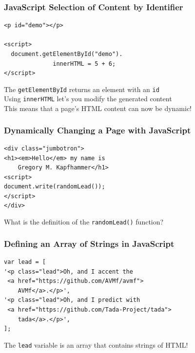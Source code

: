 \documentclass[14pt,aspectratio=169]{beamer}
\begin{document}
%
\begin{frame}[fragile]
  \frametitle{JavaScript Selection of Content by Identifier}
  \normalsize
  \begin{minipage}{6in}
    \vspace*{.1in}
    \begin{verbatim}
<p id="demo"></p>

<script>
  document.getElementById("demo").
              innerHTML = 5 + 6;
</script>
    \end{verbatim}
  \end{minipage}
  \vspace*{.1in}
  \begin{center}
    The {\tt getElementById} returns an element with an {\tt id} \\
    Using {\tt innerHTML} let's you modify the generated content \\
    This means that a page's HTML content can now be dynamic! \\
  \end{center}
\end{frame}

%
\begin{frame}[fragile]
  \frametitle{Dynamically Changing a Page with JavaScript}
  \normalsize
  \begin{minipage}{6in}
    \vspace*{.2in}
    \begin{verbatim}
<div class="jumbotron">
<h1><em>Hello</em> my name is
    Gregory M. Kapfhammer</h1>
<script>
document.write(randomLead());
</script>
</div>
    \end{verbatim}
  \end{minipage}
  \vspace*{.1in}
  \begin{center}
    What is the definition of the {\tt randomLead()} function?
  \end{center}
\end{frame}

%
\begin{frame}[fragile]
  \frametitle{Defining an Array of Strings in JavaScript}
  \normalsize
  \begin{minipage}{6in}
    \vspace*{.2in}
    \begin{verbatim}
var lead = [
'<p class="lead">Oh, and I accent the
 <a href="https://github.com/AVMf/avmf">
    AVMf</a>.</p>',
'<p class="lead">Oh, and I predict with
 <a href="https://github.com/Tada-Project/tada">
    tada</a>.</p>',
];
    \end{verbatim}
  \end{minipage}
  \vspace*{.1in}
  \begin{center}
    The {\tt lead} variable is an array that contains strings of HTML!
  \end{center}
\end{frame}
\end{document}
